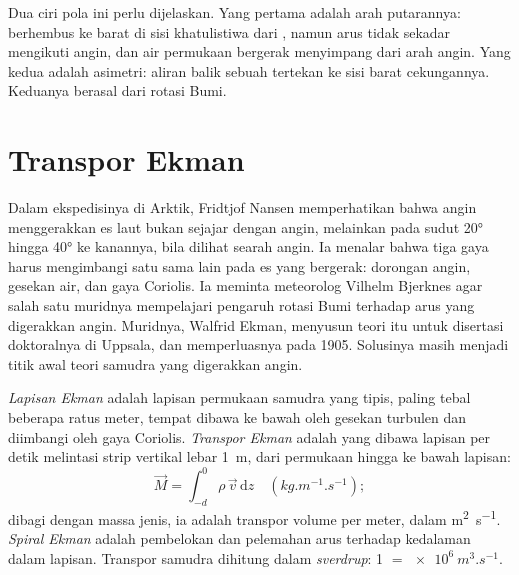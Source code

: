 Dua ciri pola ini perlu dijelaskan. Yang pertama adalah arah putarannya:  berhembus ke barat di sisi khatulistiwa dari , namun arus  tidak sekadar mengikuti angin, dan air permukaan bergerak menyimpang dari arah angin. Yang kedua adalah asimetri: aliran balik sebuah  tertekan ke sisi barat cekungannya. Keduanya berasal dari rotasi Bumi.

\section{Transpor Ekman}\label{sec:b1:ocean-circulation:ekman}

\begin{history}
Dalam ekspedisinya di Arktik, Fridtjof Nansen memperhatikan bahwa angin menggerakkan es laut bukan sejajar dengan angin, melainkan pada sudut \ang{20} hingga \ang{40} ke kanannya, bila dilihat searah angin. Ia menalar bahwa tiga gaya harus mengimbangi satu sama lain pada es yang bergerak: dorongan angin, gesekan air, dan gaya Coriolis. Ia meminta meteorolog Vilhelm Bjerknes agar salah satu muridnya mempelajari pengaruh rotasi Bumi terhadap arus yang digerakkan angin. Muridnya, Walfrid Ekman, menyusun teori itu untuk disertasi doktoralnya di Uppsala, dan memperluasnya pada 1905. Solusinya masih menjadi titik awal teori samudra yang digerakkan angin.
\end{history}

\begin{definition}\label{def:b1:ocean-circulation:ekman}
\emph{Lapisan Ekman} adalah lapisan permukaan samudra yang tipis, paling tebal beberapa ratus meter, tempat  dibawa ke bawah oleh gesekan turbulen dan diimbangi oleh gaya Coriolis. \emph{Transpor Ekman} adalah  yang dibawa lapisan per detik melintasi strip vertikal lebar \qty{1}{m}, dari permukaan hingga ke bawah lapisan:
\[
  \vec M = \int_{-d}^{0} \rho\,\vec v\,\mathrm dz \quad (\unit{kg.m^{-1}.s^{-1}});
\]
dibagi dengan massa jenis, ia adalah transpor volume per meter, dalam \unit{m^2.s^{-1}}. \emph{Spiral Ekman} adalah pembelokan dan pelemahan arus terhadap kedalaman dalam lapisan. Transpor samudra dihitung dalam \emph{sverdrup}: \qty{1}{\sverdrup} $=
\qty{e6}{m^3.s^{-1}}$.
\end{definition}

